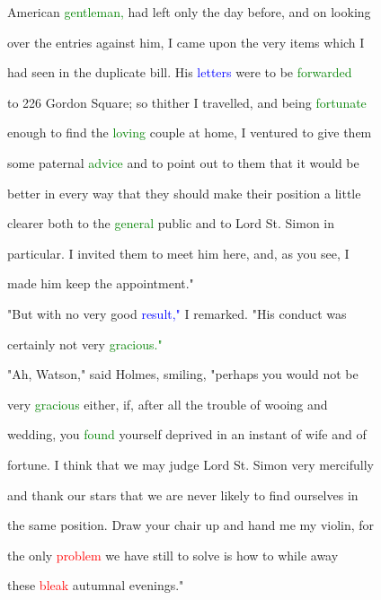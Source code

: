  American \textcolor{green}{gentleman,} had left only the day before, and on looking

 over the entries against him, I came upon the very items which I

 had seen in the duplicate bill. His \textcolor{blue}{letters} were to be \textcolor{green}{forwarded}

 to 226 Gordon Square; so thither I travelled, and being \textcolor{green}{fortunate}

 enough to find the \textcolor{green}{loving} couple at home, I ventured to give them

 some paternal \textcolor{green}{advice} and to point out to them that it would be

 better in every way that they should make their position a little

 clearer both to the \textcolor{green}{general} \textcolor{BurntOrange}{public} and to \textcolor{BurntOrange}{Lord} St. Simon in

 particular. I \textcolor{BurntOrange}{invited} them to meet him here, and, as you see, I

 made him keep the appointment."



 "But with no very \textcolor{BurntOrange}{good} \textcolor{blue}{result,"} I remarked. "His conduct was

 certainly not very \textcolor{green}{gracious."}



 "Ah, Watson," said Holmes, \textcolor{BurntOrange}{smiling,} "perhaps you would not be

 very \textcolor{green}{gracious} either, if, after all the trouble of wooing and

 wedding, you \textcolor{green}{found} yourself deprived in an instant of wife and of

 \textcolor{BurntOrange}{fortune.} I think that we may judge \textcolor{BurntOrange}{Lord} St. Simon very mercifully

 and thank our \textcolor{BurntOrange}{stars} that we are never likely to find ourselves in

 the same position. Draw your chair up and hand me my violin, for

 the only \textcolor{red}{problem} we have still to solve is how to while away

 these \textcolor{red}{bleak} autumnal evenings."







